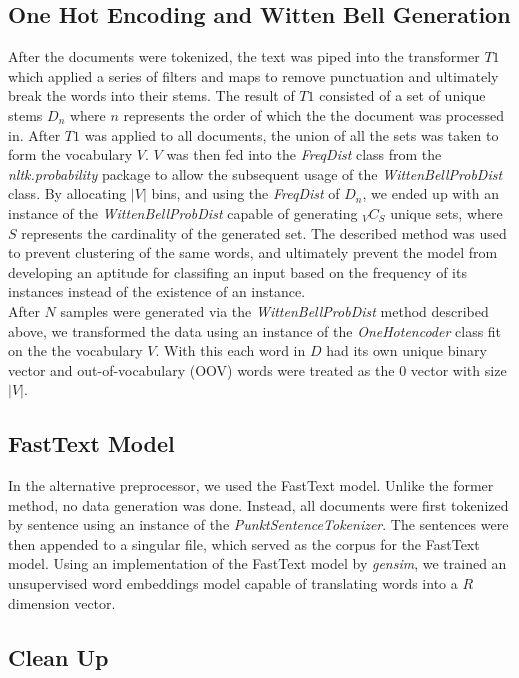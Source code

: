 \documentclass[12pt]{report}
\begin{document}
\subsection{One Hot Encoding and Witten Bell Generation} 
After the documents were tokenized, the text was piped into the transformer $T1$ which applied a
series of filters and maps to remove punctuation and ultimately break the words
into their stems. The result of $T1$ consisted of a set of unique stems $D_n$
where $n$ represents the order of which the the document was processed in.
After $T1$ was applied to all documents, the union of all the sets was taken to
form the vocabulary $V$. $V$ was then fed into the \emph{FreqDist} class from
the \emph{nltk.probability} package to allow the subsequent usage of the
\emph{WittenBellProbDist} class. By allocating $|V|$ bins, and using the
\emph{FreqDist} of $D_n$, we ended up with an instance of the
\emph{WittenBellProbDist} capable of generating ${}_{V}C_{S}$ unique sets,
where $S$ represents the cardinality of the generated set. The described method
was used to prevent clustering of the same words, and ultimately prevent the
model from developing an aptitude for classifing an input based on the
frequency of its instances instead of the existence of an instance.\\

After $N$ samples were generated via the \emph{WittenBellProbDist} method
described above, we transformed the data using an instance of the
\emph{OneHotencoder} class fit on the the vocabulary $V$.
With this each word in $D$ had its own unique binary vector and out-of-vocabulary (OOV)
words were treated as the $0$ vector with size $|V|$.

\subsection{FastText Model}
In the alternative preprocessor, we used the FastText model. Unlike the former method,
no data generation was done. Instead, all documents were first tokenized by sentence using
an instance of the \emph{PunktSentenceTokenizer}. The sentences were then appended to
a singular file, which served as the corpus for the FastText model. Using an implementation of
the FastText model by \emph{gensim}, we trained an unsupervised word embeddings model 
capable of translating words into a $R$ dimension vector.   


\subsection{Clean Up}
\end{document}
